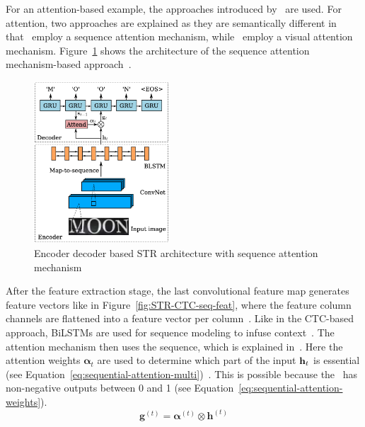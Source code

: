 For an attention-based example, the approaches introduced by~\cite{shi_robust_2016,ghosh_visual_2017}
are used.
For attention, two approaches are explained as they are semantically different in
that~\citep{shi_robust_2016} employ a sequence attention mechanism, while~\cite{ghosh_visual_2017}
employ a visual attention mechanism.
Figure~\ref{fig:STR-sequence-attention} shows the architecture of the sequence attention
mechanism-based approach~\citep{shi_robust_2016}.
\begin{figure}[h]
    \centering
    \includegraphics[width=0.45\textwidth]{img/STR-encdec-attention-Shi-Robust-2016.png}
    \caption[Encoder decoder \& sequence attention based STR architecture]{%
        Encoder decoder based STR architecture with sequence attention
        mechanism~\citep{shi_robust_2016}\label{fig:STR-sequence-attention}
    }
\end{figure}
After the feature extraction stage, the last convolutional feature map generates feature
vectors like in Figure~\ref{fig:STR-CTC-seq-feat}, where the feature column channels are flattened
into a feature vector per column~\citep{shi_robust_2016,shi_end--end_2017}.
Like in the \ac{CTC}-based approach, \acp{BiLSTM} are used for sequence modeling to infuse
context~\citep{shi_robust_2016,shi_end--end_2017}.
The attention mechanism then uses the sequence, which is explained
in~\citep{chorowski_attention-based_2015}.
Here the attention weights $\boldsymbol{\alpha}_t$ are used to determine which part of the input
$\textbf{h}_t$ is essential (see Equation~\ref{eq:sequential-attention-multi})~\citep{shi_robust_2016}.
This is possible because the \sfmx\ has non-negative outputs between 0 and 1 (see
Equation~\ref{eq:sequential-attention-weights}).
\begin{equation}\label{eq:sequential-attention-multi}
    \textbf{g}^{(t)}=\boldsymbol{\alpha}^{(t)} \otimes \textbf{h}^{(t)}
\end{equation}

